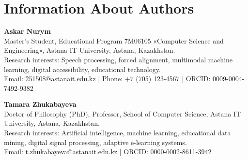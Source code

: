 \documentclass[12pt,a4paper]{article}
\begin{document}
\section*{Information About Authors}
\textbf{Askar Nurym} \\
Master's Student, Educational Program 7M06105 «Computer Science and Engineering», Astana IT University, Astana, Kazakhstan. \\
Research interests: Speech processing, forced alignment, multimodal machine learning, digital accessibility, educational technology. \\
Email: 251508@astanait.edu.kz \quad | \quad Phone: +7 (705) 123-4567 \quad | \quad ORCID: 0009-0004-7492-9382 \par
\vspace{0.3cm}
\textbf{Tamara Zhukabayeva} \\
Doctor of Philosophy (PhD), Professor, School of Computer Science, Astana IT University, Astana, Kazakhstan. \\
Research interests: Artificial intelligence, machine learning, educational data mining, digital signal processing, adaptive e-learning systems. \\
Email: t.zhukabayeva@astanait.edu.kz \quad | \quad ORCID: 0000-0002-8611-3942
\end{document}
